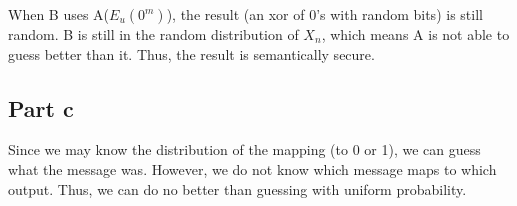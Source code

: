 \documentclass{article}
\begin{document}
When B uses A($E_u(0^m)$), the result (an xor of 0's with random bits) is still random.  B is still in the random distribution of $X_n$, which means A is not able to guess better than it.  Thus, the result is semantically secure.

\subsection{Part c}

Since we may know the distribution of the mapping (to 0 or 1), we can guess what the message was.  However, we do not know which message maps to which output.  Thus, we can do no better than guessing with uniform probability.
\end{document}
